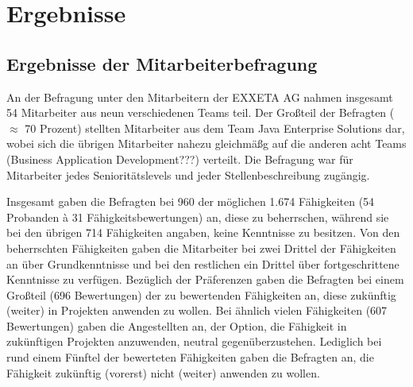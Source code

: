
\chapter{Ergebnisse}
\label{ch:ergebnisse}

\section{Ergebnisse der Mitarbeiterbefragung}
An der Befragung unter den Mitarbeitern der EXXETA AG nahmen insgesamt 54 Mitarbeiter aus neun verschiedenen Teams teil.
Der Großteil der Befragten ($\approx$ 70 Prozent) stellten Mitarbeiter aus dem Team Java Enterprise Solutions dar, wobei sich die übrigen Mitarbeiter nahezu gleichmäßg auf die anderen acht Teams (Business Application Development???) verteilt.
Die Befragung war für Mitarbeiter jedes Senioritätslevels und jeder Stellenbeschreibung zugängig.


Insgesamt gaben die Befragten bei 960 der möglichen 1.674 Fähigkeiten (54 Probanden \`{a} 31 Fähigkeitsbewertungen) an, diese zu beherrschen, während sie bei den übrigen 714 Fähigkeiten angaben, keine Kenntnisse zu besitzen.
Von den beherrschten Fähigkeiten gaben die Mitarbeiter bei zwei Drittel der Fähigkeiten an über Grundkenntnisse und bei den restlichen ein Drittel über fortgeschrittene Kenntnisse zu verfügen.
Bezüglich der Präferenzen gaben die Befragten bei einem Großteil (696 Bewertungen) der zu bewertenden Fähigkeiten an, diese zukünftig (weiter) in Projekten anwenden zu wollen.
Bei ähnlich vielen Fähigkeiten (607 Bewertungen) gaben die Angestellten an, der Option, die Fähigkeit in zukünftigen Projekten anzuwenden, neutral gegenüberzustehen.
Lediglich bei rund einem Fünftel der bewerteten Fähigkeiten gaben die Befragten an, die Fähigkeit zukünftig (vorerst) nicht (weiter) anwenden zu wollen.

